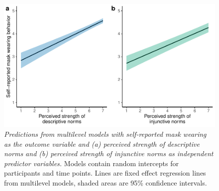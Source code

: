 \documentclass[
  man, donotrepeattitle,floatsintext]{apa6}
\begin{document}
\begin{figure}
\centering
\includegraphics{manuscript_files/figure-latex/plotCorBehNorm-1.pdf}
\caption{\label{fig:plotCorBehNorm}\emph{Predictions from multilevel models with self-reported mask wearing as the outcome variable and (a) perceived strength of descriptive norms and (b) perceived strength of injunctive norms as independent predictor variables.} Models contain random intercepts for participants and time points. Lines are fixed effect regression lines from multilevel models, shaded areas are 95\% confidence intervals.}
\end{figure}

\newpage
\end{document}
